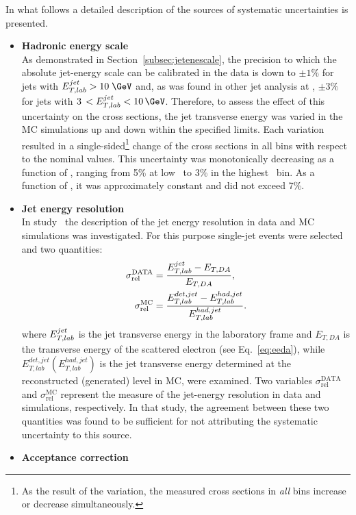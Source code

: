 In what follows a detailed description of the sources of systematic uncertainties is presented.
\begin{itemize}
	\item \textbf{Hadronic energy scale} \\
		As demonstrated in Section~\ref{subsec:jetenescale}, the precision to which the absolute jet-energy scale can be calibrated in the data is down to $\pm1\%$ for jets with $\etjetlab > 10\;\GeV$ and, as was found in other jet analysis at \zeus, $\pm3\%$ for jets with $3\,< \etjetlab < 10\,\GeV$. Therefore, to assess the effect of this uncertainty on the cross sections, the jet transverse energy was varied in the MC simulations up and down within the specified limits. Each variation resulted in a single-sided\footnote{As the result of the variation, the measured cross sections in \textit{all} bins increase or decrease simultaneously.} change of the cross sections in all bins with respect to the nominal values. This uncertainty was monotonically decreasing as a function of \qsq, ranging from 5\% at low \qsq~to 3\% in the highest \qsq~bin. As a function of \etjetb, it was approximately constant and did not exceed 7\%.
 \item \textbf{Jet energy resolution} \\
     In study~\cite{thesis:behr:2010} the description of the jet energy resolution in data and MC simulations was investigated. For this purpose single-jet events were selected and two quantities:
		\begin{align}
		\sigma_\mathrm{rel}^\mathrm{DATA} &= \frac{\mbox{$E_{T,lab}^{jet}$}-E_{T,DA}}{E_{T,DA}},\label{eq:dataetres}\\
		\sigma_\mathrm{rel}^\mathrm{MC} &= \frac{E_{T,lab}^{det,jet}-E_{T,lab}^{had,jet}}{E_{T,lab}^{had,jet}} \label{eq:mcetres}.
		\end{align}
		where $\mbox{$E_{T,lab}^{jet}$}$ is the jet transverse energy in the laboratory frame and $E_{T,DA}$ is the transverse energy of the scattered electron (see Eq.~\eqref{eq:eeda}), while $E_{T,lab}^{det,jet}(E_{T,lab}^{had,jet})$ is the jet transverse energy determined at the reconstructed (generated) level in MC, were examined. Two variables $\sigma_\mathrm{rel}^\mathrm{DATA}$ and $\sigma_\mathrm{rel}^\mathrm{MC}$ represent the measure of the jet-energy resolution in data and simulations, respectively. In that study, the agreement between these two quantities was found to be sufficient for not attributing the systematic uncertainty to this source.
	\item \textbf{Acceptance correction} \\

\end{itemize}
